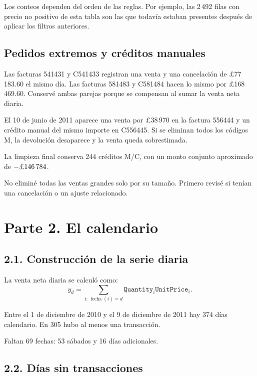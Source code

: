 \documentclass[11pt,letterpaper]{article}
\begin{document}
Los conteos dependen del orden de las reglas. Por ejemplo, las 2\,492 filas con precio no positivo de esta tabla son las que todavía estaban presentes después de aplicar los filtros anteriores.

\subsection*{Pedidos extremos y créditos manuales}

Las facturas 541431 y C541433 registran una venta y una cancelación de \pounds77\,183.60 el mismo día. Las facturas 581483 y C581484 hacen lo mismo por \pounds168\,469.60. Conservé ambas parejas porque se compensan al sumar la venta neta diaria.

El 10 de junio de 2011 aparece una venta por \pounds38\,970 en la factura 556444 y un crédito manual del mismo importe en C556445. Si se eliminan todos los códigos M, la devolución desaparece y la venta queda sobrestimada.

La limpieza final conserva 244 créditos M/C, con un monto conjunto aproximado de $-\text{\pounds}146\,784$.

No eliminé todas las ventas grandes solo por su tamaño. Primero revisé si tenían una cancelación o un ajuste relacionado.

\section*{Parte 2. El calendario}

\subsection*{2.1. Construcción de la serie diaria}

La venta neta diaria se calculó como:
\[
y_d=
\sum_{i:\,\operatorname{fecha}(i)=d}
\texttt{Quantity}_i\texttt{UnitPrice}_i.
\]

Entre el 1 de diciembre de 2010 y el 9 de diciembre de 2011 hay 374 días calendario. En 305 hubo al menos una transacción.

Faltan 69 fechas: 53 sábados y 16 días adicionales.

\subsection*{2.2. Días sin transacciones}
\end{document}
